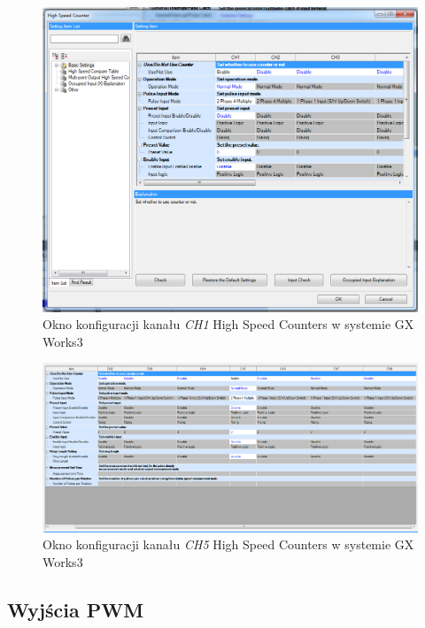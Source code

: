 \documentclass{mwrep}
\begin{document}
\begin{figure}[H]
    \label{PLC::Konfiguracja::HIOEN::WindowCH1}
    \centering
    \includegraphics[scale=0.3]{hioen.png}
    \caption{Okno konfiguracji kanału \emph{CH1} High Speed Counters w systemie GX Works3}
\end{figure}

\begin{figure}[H]
    \label{PLC::Konfiguracja::HIOEN::WindowCH5}
    \leftskip-1.5cm
    \includegraphics[scale=0.3]{hioen2.png}
    \caption{Okno konfiguracji kanału \emph{CH5} High Speed Counters w systemie GX Works3}
\end{figure}


\subsection{Wyjścia PWM}
\label{PLC::Konfiguracja::PWM}



\newpage
\end{document}
